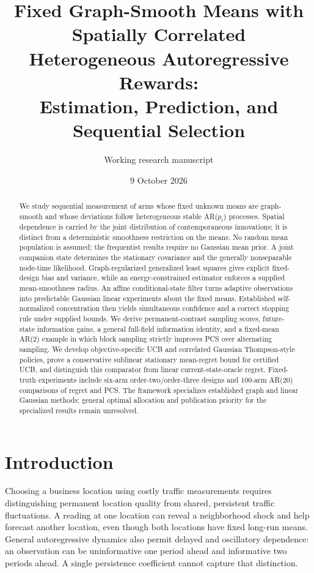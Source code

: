 \documentclass[11pt]{article}
\title{Fixed Graph-Smooth Means with Spatially Correlated\\Heterogeneous Autoregressive Rewards:\\Estimation, Prediction, and Sequential Selection}
\author{Working research manuscript}
\date{9 October 2026}
\begin{document}
\maketitle
\begin{abstract}
We study sequential measurement of arms whose fixed unknown means are graph-smooth and whose deviations follow heterogeneous stable AR($p_i$) processes. Spatial dependence is carried by the joint distribution of contemporaneous innovations; it is distinct from a deterministic smoothness restriction on the means. No random mean population is assumed; the frequentist results require no Gaussian mean prior. A joint companion state determines the stationary covariance and the generally nonseparable node-time likelihood. Graph-regularized generalized least squares gives explicit fixed-design bias and variance, while an energy-constrained estimator enforces a supplied mean-smoothness radius. An affine conditional-state filter turns adaptive observations into predictable Gaussian linear experiments about the fixed means. Established self-normalized concentration then yields simultaneous confidence and a correct stopping rule under supplied bounds. We derive permanent-contrast sampling scores, future-state information gains, a general full-field information identity, and a fixed-mean AR(2) example in which block sampling strictly improves PCS over alternating sampling. We develop objective-specific UCB and correlated Gaussian Thompson-style policies, prove a conservative sublinear stationary mean-regret bound for certified UCB, and distinguish this comparator from linear current-state-oracle regret. Fixed-truth experiments include six-arm order-two/order-three designs and 100-arm AR(20) comparisons of regret and PCS. The framework specializes established graph and linear Gaussian methods; general optimal allocation and publication priority for the specialized results remain unresolved.
\end{abstract}

\section{Introduction}
Choosing a business location using costly traffic measurements requires distinguishing permanent location quality from shared, persistent traffic fluctuations. A reading at one location can reveal a neighborhood shock and help forecast another location, even though both locations have fixed long-run means. General autoregressive dynamics also permit delayed and oscillatory dependence: an observation can be uninformative one period ahead and informative two periods ahead. A single persistence coefficient cannot capture that distinction.
\end{document}
